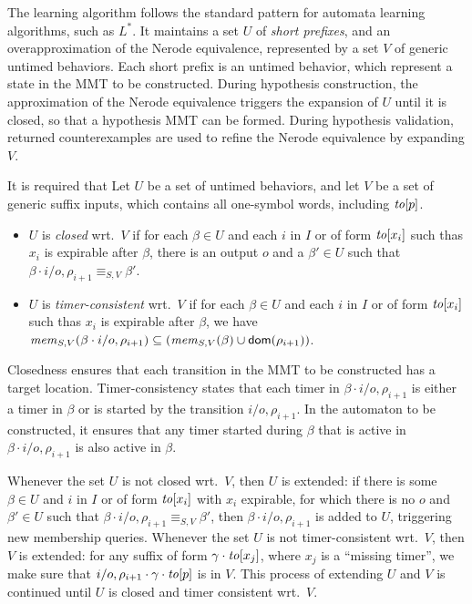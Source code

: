 The learning algorithm follows the standard pattern for automata learning
algorithms, such as $L^*$. It maintains
a set $U$ of {\em short prefixes}, and
  an overapproximation of the Nerode equivalence,
  represented by a set $V$ of generic untimed behaviors.
  Each short prefix is an untimed
behavior, which represent a state in the MMT to be constructed.
During hypothesis construction,
the approximation of the Nerode equivalence triggers the expansion of
$U$ until it is closed, so that a hypothesis MMT can be formed.
During hypothesis validation, returned counterexamples are used to refine
the Nerode equivalence by expanding $V$.

It is required that 
Let $U$ be a set of untimed behaviors, and let $V$ be a set of generic suffix
inputs, which contains all one-symbol words, including $\toevent{p}$.
\begin{itemize}
\item
$U$ is {\em closed} wrt.\ $V$ if 
  for each $\beta \in U$ and each
  $i$ in $I$ or of form $\toevent{x_i}$ such thas $x_i$ is expirable
  after $\beta$,
  there is an output $o$ and a $\beta' \in U$ such that
  $\beta \cdot i/o,\rho_{i+1} \equiv_{S,V} \beta'$.
\item
$U$ is {\em timer-consistent} wrt.\ $V$ if 
  for each $\beta \in U$ and each
  $i$ in $I$ or of form $\toevent{x_i}$ such thas $x_i$ is expirable
  after $\beta$, we have
  $\getmemorable{S}{\beta \cdot i/o,\rho_{i+1}}{V} \subseteq
  (\getmemorable{S}{\beta}{V} \cup \domof{\rho_{i+1}})$.
\end{itemize}
Closedness ensures 
that each transition in the MMT to be constructed has a target location. 
Timer-consistency states that each timer in $\beta \cdot i/o,\rho_{i+1}$
is either a timer in $\beta$ or is started by the transition $i/o,\rho_{i+1}$.
In the automaton to be constructed, it ensures that
any timer started during $\beta$ that is active in $\beta \cdot i/o,\rho_{i+1}$
is also active in $\beta$.

Whenever the set $U$ is not closed wrt.\ $V$, then $U$ is extended:
if there is some $\beta \in U$ and $i$ in $I$ or of form $\toevent{x_i}$ with
$x_i$ expirable, for which there is no $o$ and $\beta' \in U$ such that
$\beta \cdot i/o,\rho_{i+1} \equiv_{S,V} \beta'$, 
then $\beta \cdot i/o,\rho_{i+1}$ is added to $U$,
triggering new membership queries.
Whenever the set $U$ is not timer-consistent wrt.\ $V$, then $V$ is extended:
for any suffix of form $\gamma \cdot \toevent{x_j}$, where
$x_j$ is a ``missing timer'', we make sure that $i/o,\rho_{i+1} \cdot \gamma \cdot \toevent{p}$ is in $V$.
    This process of
    extending $U$ and $V$ is continued until $U$ is closed
    and timer consistent wrt.\ $V$.

